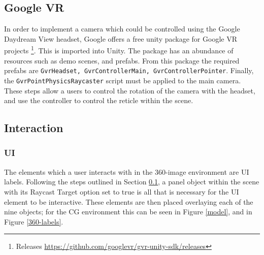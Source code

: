 \documentclass[a4paper, openright, twoside]{book}
\begin{document}
\subsection{Google VR}\label{googlevr}

In order to implement a camera which could be controlled using the Google Daydream View headset, Google offers a free unity package for Google VR projects \footnote{Releases \url{https://github.com/googlevr/gvr-unity-sdk/releases}}. This is imported into Unity. The package has an abundance of resources such as demo scenes, and prefabs. From this package the required prefabs are \lstinline{GvrHeadset, GvrControllerMain, GvrControllerPointer}. Finally, the \lstinline{GvrPointPhysicsRaycaster} script must be applied to the main camera. These steps allow a users to control the rotation of the camera with the headset, and use the controller to control the reticle within the scene. 

\subsection{Interaction}

\subsubsection{UI}
The elements which a user interacts with in the 360-image environment are UI labels. Following the steps outlined in Section \ref{googlevr}, a panel object within the scene with its Raycast Target option set to true is all that is necessary for the UI element to be interactive. These elements are then placed overlaying each of the nine objects; for the CG environment this can be seen in Figure \ref{model}, and in Figure \ref{360-labels}. 
\end{document}

